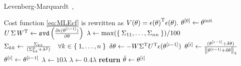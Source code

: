 \begin{algorithm}
\caption{Levenberg-Marquardt~\citep{Marquardt1963},~\citep[Sec. 9.L.4]{Pintelon2012}}
\label{alg:initvals:levenberg-marquardt}
\begin{algorithmic}[1]
  \Require Cost function \eqref{eq:MLEcf} is rewritten as $V(\theta) = \InnerProductSelf{\epsilon(\theta)}$. 
   \State $\atIter[0]{\theta} \gets \theta^{\mathrm{init}}$
      \State $U \, \Sigma \, W^{\TT} \gets \code{svd}\left( \frac{\partial \epsilon(\atIter[i-1]{\theta})}{\partial \theta}\right)$ 
        \State $\lambda \gets \max(\Set{\Sigma_{11}, \ldots, \Sigma_{nn}})/100$
      \EndIf
      \State $\Sigma_{kk} \gets \frac{\Sigma_{kk}}{(\Sigma_{kk}^2 + \lambda^2)} \quad \forall k \in \Set{1, \ldots, n}$
      \State $\delta\theta \gets - W  \Sigma^{\TT}  U^{\TT} \epsilon(\atIter[i-1]{\theta})$
      \State $\atIter[i]{\theta} \gets \frac{(\atIter[i-1]{\theta} + \delta\theta) }{ \norm[2]{\atIter[i-1]{\theta} + \delta\theta} }$
       
         \State $\atIter[i]{\theta} \gets \atIter[i-1]{\theta}$ 
          \State $\lambda \gets 10 \lambda$ 
      \Else
          \State $\lambda \gets 0.4 \lambda$
      \EndIf
          \State \textbf{return} $\hat{\theta} \gets \atIter[i]{\theta}$
      \EndIf
   \EndFor
\EndFunction
\end{algorithmic}
\end{algorithm}

